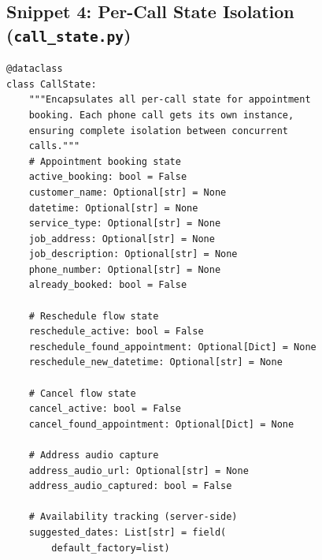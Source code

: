 \documentclass[conference]{IEEEtran}
\begin{document}
\subsection*{Snippet 4: Per-Call State Isolation (\texttt{call\_state.py})}
\begin{lstlisting}[caption={Dataclass ensuring complete isolation between concurrent calls}]
@dataclass
class CallState:
    """Encapsulates all per-call state for appointment
    booking. Each phone call gets its own instance,
    ensuring complete isolation between concurrent
    calls."""
    # Appointment booking state
    active_booking: bool = False
    customer_name: Optional[str] = None
    datetime: Optional[str] = None
    service_type: Optional[str] = None
    job_address: Optional[str] = None
    job_description: Optional[str] = None
    phone_number: Optional[str] = None
    already_booked: bool = False

    # Reschedule flow state
    reschedule_active: bool = False
    reschedule_found_appointment: Optional[Dict] = None
    reschedule_new_datetime: Optional[str] = None

    # Cancel flow state
    cancel_active: bool = False
    cancel_found_appointment: Optional[Dict] = None

    # Address audio capture
    address_audio_url: Optional[str] = None
    address_audio_captured: bool = False

    # Availability tracking (server-side)
    suggested_dates: List[str] = field(
        default_factory=list)
\end{lstlisting}

\end{document}
